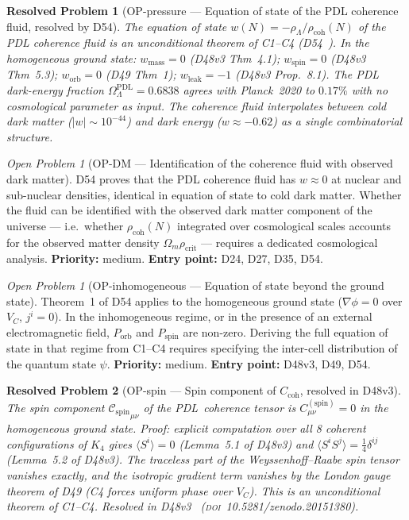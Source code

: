 \documentclass[11pt,a4paper]{article}
\newtheorem{resolvedproblem}{Resolved Problem}
\newcommand{\Cspin}{{\mathcal{C}_{\mathrm{spin}}}}
\theoremstyle{plain}
\theoremstyle{definition}
\theoremstyle{remark}
\newtheorem{openproblem}[theorem]{Open Problem}
\newcommand{\PDL}{\textnormal{PDL}}
\newcommand{\rhocoh}{\rho_{\mathrm{coh}}}
\newcommand{\Ccoh}{C_{\mathrm{coh}}}
\begin{document}
\begin{resolvedproblem}[OP-pressure --- Equation of state of the PDL coherence fluid, resolved by D54]
\label{op:pressure}
The equation of state $w(N) = -\rho_\Lambda/\rhocoh(N)$ of the PDL coherence fluid is an unconditional theorem of C1--C4 (D54~\cite{D54}). In the homogeneous ground state: $w_{\mathrm{mass}} = 0$ (D48v3 Thm~4.1); $w_{\mathrm{spin}} = 0$ (D48v3 Thm~5.3); $w_{\mathrm{orb}} = 0$ (D49 Thm~1); $w_{\mathrm{leak}} = -1$ (D48v3 Prop.~8.1). The PDL dark-energy fraction $\Omega_\Lambda^{\mathrm{PDL}} = 0.6838$ agrees with Planck~2020 to $0.17\%$ with no cosmological parameter as input. The coherence fluid interpolates between cold dark matter ($|w| \sim 10^{-44}$) and dark energy ($w \approx -0.62$) as a single combinatorial structure.
\end{resolvedproblem}

\begin{openproblem}[OP-DM --- Identification of the coherence fluid with observed dark matter]
\label{op:DM}
D54 proves that the PDL coherence fluid has $w \approx 0$ at nuclear and sub-nuclear densities, identical in equation of state to cold dark matter. Whether the fluid can be identified with the observed dark matter component of the universe --- i.e.\ whether $\rhocoh(N)$ integrated over cosmological scales accounts for the observed matter density $\Omega_m \rho_{\mathrm{crit}}$ --- requires a dedicated cosmological analysis. \textbf{Priority:} medium. \textbf{Entry point:} D24, D27, D35, D54.
\end{openproblem}

\begin{openproblem}[OP-inhomogeneous --- Equation of state beyond the ground state]
\label{op:inhomogeneous}
Theorem~1 of D54 applies to the homogeneous ground state ($\nabla\phi = 0$ over $V_C$, $j^i = 0$). In the inhomogeneous regime, or in the presence of an external electromagnetic field, $P_{\mathrm{orb}}$ and $P_{\mathrm{spin}}$ are non-zero. Deriving the full equation of state in that regime from C1--C4 requires specifying the inter-cell distribution of the quantum state $\psi$. \textbf{Priority:} medium. \textbf{Entry point:} D48v3, D49, D54.
\end{openproblem}

\begin{resolvedproblem}[OP-spin --- Spin component of $\Ccoh$, resolved in D48v3]
\label{op:spin}
The spin component $\Cspin_{\mu\nu}$ of the \PDL\ coherence tensor is $C^{(\mathrm{spin})}_{\mu\nu} = 0$ in the homogeneous ground state. Proof: explicit computation over all 8 coherent configurations of $K_4$ gives $\langle S^i\rangle = 0$ (Lemma~5.1 of D48v3) and $\langle S^i S^j\rangle = \tfrac{1}{4}\delta^{ij}$ (Lemma~5.2 of D48v3). The traceless part of the Weyssenhoff--Raabe spin tensor vanishes exactly, and the isotropic gradient term vanishes by the London gauge theorem of D49 (C4 forces uniform phase over $V_C$). This is an unconditional theorem of C1--C4. Resolved in D48v3~\cite{D48} (\textsc{doi}~10.5281/zenodo.20151380).
\end{resolvedproblem}
\end{document}
